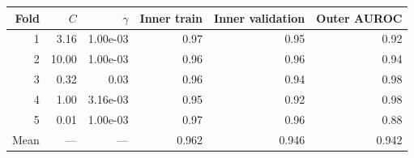 \begin{tabular}{rrrrrr}
\toprule
Fold & $C$ & $\gamma$ & Inner train & Inner validation & Outer AUROC \\
\midrule
1 & 3.16 & 1.00e-03 & 0.97 & 0.95 & 0.92 \\
2 & 10.00 & 1.00e-03 & 0.96 & 0.96 & 0.94 \\
3 & 0.32 & 0.03 & 0.96 & 0.94 & 0.98 \\
4 & 1.00 & 3.16e-03 & 0.95 & 0.92 & 0.98 \\
5 & 0.01 & 1.00e-03 & 0.97 & 0.96 & 0.88 \\
Mean & --- & --- & 0.962 & 0.946 & 0.942 \\
\bottomrule
\end{tabular}

